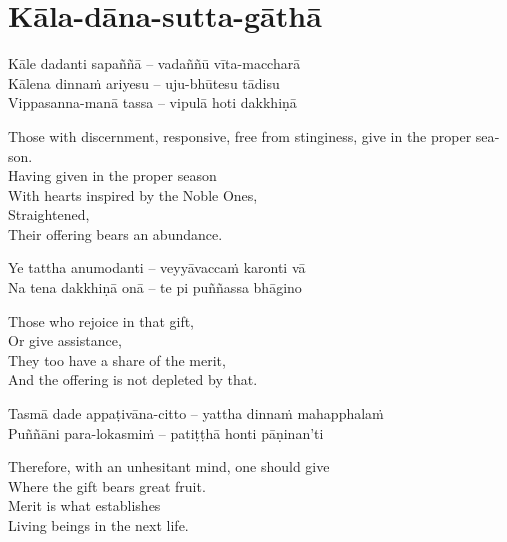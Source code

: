 
\section{Kāla-dāna-sutta-gāthā}

\begin{twochants}
  Kāle dadanti sapaññā – vadaññū vīta-maccharā\\
  Kālena dinnaṁ ariyesu – uju-bhūtesu tādisu\\
  Vippasanna-manā tassa – vipulā hoti dakkhiṇā\\
\end{twochants}

\begin{english}
  Those with discernment, responsive, free from stinginess, give in the proper season.\\
  Having given in the proper season\\
  With hearts inspired by the Noble Ones,\\
  Straightened,\\
  Their offering bears an abundance.
\end{english}

\begin{twochants}
  Ye tattha anumodanti – veyyāvaccaṁ karonti vā\\
  Na tena dakkhiṇā onā – te pi puññassa bhāgino\\
\end{twochants}

\begin{english}
  Those who rejoice in that gift,\\
  Or give assistance,\\
  They too have a share of the merit,\\
  And the offering is not depleted by that.
\end{english}

\begin{twochants}
  Tasmā dade appaṭivāna-citto – yattha dinnaṁ mahapphalaṁ\\
  Puññāni para-lokasmiṁ – patiṭṭhā honti pāṇinan'ti
\end{twochants}

\begin{english}
  Therefore, with an unhesitant mind, one should give\\
  Where the gift bears great fruit.\\
  Merit is what establishes\\
  Living beings in the next life.
\end{english}

